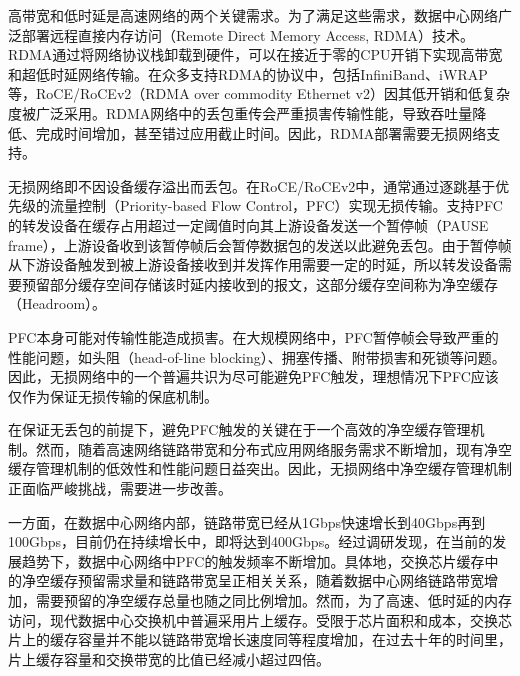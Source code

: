 



高带宽和低时延是高速网络的两个关键需求。为了满足这些需求，数据中心网络广泛部署远程直接内存访问（Remote Direct Memory Access, RDMA）技术\cite{SIGCOMM16RDMA,JYRJ202103005}。RDMA通过将网络协议栈卸载到硬件，可以在接近于零的CPU开销下实现高带宽和超低时延网络传输。在众多支持RDMA的协议中，包括InfiniBand、iWRAP等，RoCE/RoCEv2\cite{ibaRocev2}（RDMA over commodity Ethernet v2）因其低开销和低复杂度被广泛采用。RDMA网络中的丢包重传会严重损害传输性能，导致吞吐量降低、完成时间增加，甚至错过应用截止时间。因此，RDMA部署需要无损网络支持\cite{SIGCOMM15DCQCN,SIGCOMM15TIMELY,SIGCOMM16RDMA,SIGCOMM19HPCC,SIGCOMM20MasQ,liu2020datacenter}。

无损网络即不因设备缓存溢出而丢包。在RoCE/RoCEv2中，通常通过逐跳基于优先级的流量控制\cite{PFC}（Priority-based Flow Control，PFC）实现无损传输。支持PFC的转发设备在缓存占用超过一定阈值时向其上游设备发送一个暂停帧（PAUSE frame），上游设备收到该暂停帧后会暂停数据包的发送以此避免丢包。由于暂停帧从下游设备触发到被上游设备接收到并发挥作用需要一定的时延，所以转发设备需要预留部分缓存空间存储该时延内接收到的报文\cite{SIGCOMM15DCQCN,SIGCOMM16RDMA}，这部分缓存空间称为净空缓存（Headroom）。

PFC本身可能对传输性能造成损害。在大规模网络中，PFC暂停帧会导致严重的性能问题，如头阻（head-of-line blocking）、拥塞传播、附带损害和死锁等问题\cite{SIGCOMM16RDMA,SIGCOMM19HPCC,INFOCOM14TCP-Bolt,CoNEXT17Tagger,SIGCOMM19GFC,TPDS20P-PFC,INFOCOM22ITSY, hu2022load}。因此，无损网络中的一个普遍共识为尽可能避免PFC触发，理想情况下PFC应该仅作为保证无损传输的保底机制。

在保证无丢包的前提下，避免PFC触发的关键在于一个高效的净空缓存管理机制。然而，随着高速网络链路带宽和分布式应用网络服务需求不断增加，现有净空缓存管理机制的低效性和性能问题日益突出。因此，无损网络中净空缓存管理机制正面临严峻挑战，需要进一步改善。


一方面，在数据中心网络内部，链路带宽已经从1Gbps快速增长到40Gbps再到100Gbps，目前仍在持续增长中，即将达到400Gbps\cite{SIGCOMM16RDMA,SIGCOMM15Jupiter}。经过调研发现，在当前的发展趋势下，数据中心网络中PFC的触发频率不断增加。具体地，交换芯片缓存中的净空缓存预留需求量和链路带宽呈正相关关系，随着数据中心网络链路带宽增加，需要预留的净空缓存总量也随之同比例增加。然而，为了高速、低时延的内存访问，现代数据中心交换机中普遍采用片上缓存。受限于芯片面积和成本，交换芯片上的缓存容量并不能以链路带宽增长速度同等程度增加\cite{INFOCOM20BCC,ICNP21FlashPass,BS19BFC}，在过去十年的时间里，片上缓存容量和交换带宽的比值已经减小超过四倍。

